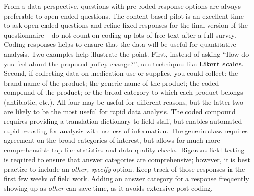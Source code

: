 From a data perspective, questions with pre-coded response options
are always preferable to open-ended questions.
The content-based pilot is an excellent time to ask open-ended questions
and refine fixed responses for the final version of the questionnaire --
do not count on coding up lots of free text after a full survey.
Coding responses helps to ensure that the data
will be useful for quantitative analysis.
Two examples help illustrate the point.
First, instead of asking ``How do you feel about the proposed policy change?'',
use techniques like \textbf{Likert scales}.
Second, if collecting data on medication use or supplies, you could collect:
the brand name of the product; the generic name of the product; the coded compound of the product;
or the broad category to which each product belongs (antibiotic, etc.).
All four may be useful for different reasons,
but the latter two are likely to be the most useful for rapid data analysis.
The coded compound requires providing a translation dictionary to field staff,
but enables automated rapid recoding for analysis with no loss of information.
The generic class requires agreement on the broad categories of interest,
but allows for much more comprehensible top-line statistics and data quality checks.
Rigorous field testing is required to ensure that answer categories are comprehensive;
however, it is best practice to include an \textit{other, specify} option.
Keep track of those responses in the first few weeks of field work.
Adding an answer category for a response frequently showing up as \textit{other} can save time,
as it avoids extensive post-coding.

